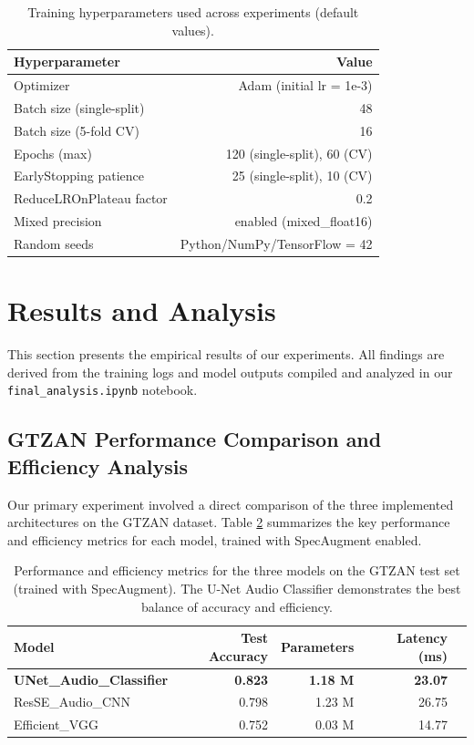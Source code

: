 \documentclass[11pt,a4paper]{article}
\begin{document}
\begin{table}[H]
\centering
\caption{Training hyperparameters used across experiments (default values).}
\label{tab:hyperparams}
\begin{tabular}{lr}
	\toprule
Hyperparameter & Value \\
\midrule
Optimizer & Adam (initial lr = 1e-3) \\
Batch size (single-split) & 48 \\
Batch size (5-fold CV) & 16 \\
Epochs (max) & 120 (single-split), 60 (CV) \\
EarlyStopping patience & 25 (single-split), 10 (CV) \\
ReduceLROnPlateau factor & 0.2 \\
Mixed precision & enabled (mixed\_float16) \\
Random seeds & Python/NumPy/TensorFlow = 42 \\
\bottomrule
\end{tabular}
\end{table}

\section{Results and Analysis}
\label{sec:results}
This section presents the empirical results of our experiments. All findings are derived from the training logs and model outputs compiled and analyzed in our \texttt{final\_analysis.ipynb} notebook.

\subsection{GTZAN Performance Comparison and Efficiency Analysis}
Our primary experiment involved a direct comparison of the three implemented architectures on the GTZAN dataset. Table \ref{tab:gtzan_main_results} summarizes the key performance and efficiency metrics for each model, trained with SpecAugment enabled.

\begin{table}[H]
\centering
\caption{Performance and efficiency metrics for the three models on the GTZAN test set (trained with SpecAugment). The U-Net Audio Classifier demonstrates the best balance of accuracy and efficiency.}
\label{tab:gtzan_main_results}
\begin{tabular}{lrrrr}
\toprule
\textbf{Model} & \textbf{Test Accuracy} & \textbf{Parameters} & \textbf{Latency (ms)} \\
\midrule
\textbf{UNet\_Audio\_Classifier} & \textbf{0.823} & \textbf{1.18 M} & \textbf{23.07} \\
ResSE\_Audio\_CNN & 0.798 & 1.23 M & 26.75 \\
Efficient\_VGG & 0.752 & 0.03 M & 14.77 \\
\bottomrule
\end{tabular}
\end{table}
\end{document}
